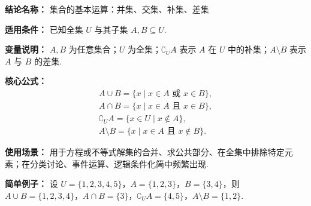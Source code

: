 \textbf{结论名称：} 集合的基本运算：并集、交集、补集、差集

\textbf{适用条件：} 已知全集 \(U\) 与其子集 \(A,B\subseteq U\).

\textbf{变量说明：} \(A,B\) 为任意集合；\(U\) 为全集；\(\complement_U A\) 表示 \(A\) 在 \(U\) 中的补集；\(A\setminus B\) 表示 \(A\) 与 \(B\) 的差集.

\textbf{核心公式：}
\[
\boxed{
\begin{array}{l}
A\cup B = \{x \mid x\in A \text{ 或 } x\in B\},\\[2pt]
A\cap B = \{x \mid x\in A \text{ 且 } x\in B\},\\[2pt]
\complement_U A = \{x\in U \mid x\notin A\},\\[2pt]
A\setminus B = \{x \mid x\in A \text{ 且 } x\notin B\}.
\end{array}
}
\]

\textbf{使用场景：} 用于方程或不等式解集的合并、求公共部分、在全集中排除特定元素；在分类讨论、事件运算、逻辑条件化简中频繁出现.

\textbf{简单例子：} 设 \(U=\{1,2,3,4,5\}\)，\(A=\{1,2,3\}\)，\(B=\{3,4\}\)，则
\(A\cup B=\{1,2,3,4\}\)，\(A\cap B=\{3\}\)，\(\complement_U A=\{4,5\}\)，\(A\setminus B=\{1,2\}\).